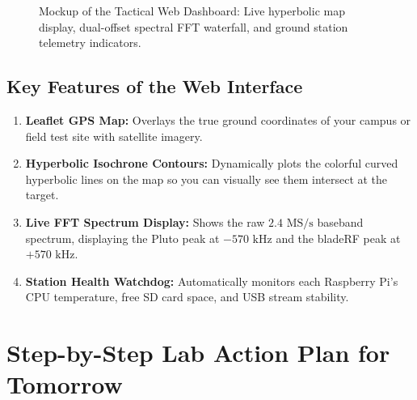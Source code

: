 \documentclass[11pt,a4paper]{article}
\begin{document}
\begin{figure}[htbp]
\caption{Mockup of the Tactical Web Dashboard: Live hyperbolic map display, dual-offset spectral FFT waterfall, and ground station telemetry indicators.}
\end{figure}

\subsection{Key Features of the Web Interface}
\begin{enumerate}[leftmargin=*]
    \item \textbf{Leaflet GPS Map:} Overlays the true ground coordinates of your campus or field test site with satellite imagery.
    \item \textbf{Hyperbolic Isochrone Contours:} Dynamically plots the colorful curved hyperbolic lines on the map so you can visually see them intersect at the target.
    \item \textbf{Live FFT Spectrum Display:} Shows the raw $2.4\text{ MS/s}$ baseband spectrum, displaying the Pluto peak at $-570\text{ kHz}$ and the bladeRF peak at $+570\text{ kHz}$.
    \item \textbf{Station Health Watchdog:} Automatically monitors each Raspberry Pi's CPU temperature, free SD card space, and USB stream stability.
\end{enumerate}

\section{Step-by-Step Lab Action Plan for Tomorrow}
\end{document}
